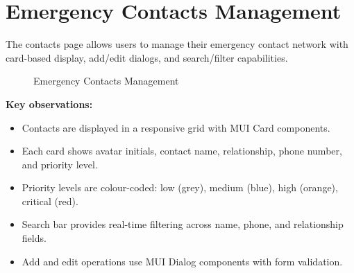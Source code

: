 \section{Emergency Contacts Management}

The contacts page allows users to manage their emergency contact network with card-based display, add/edit dialogs, and search/filter capabilities.

\begin{figure}[H]
  \centering
  \begin{minipage}{0.45\textwidth}
    \centering
  \end{minipage}
  \hfill
  \begin{minipage}{0.45\textwidth}
    \centering
  \end{minipage}
  \caption{Emergency Contacts Management}
  \label{fig:screenshot-contacts}
\end{figure}

\textbf{Key observations:}
\begin{itemize}
  \item Contacts are displayed in a responsive grid with MUI Card components.
  \item Each card shows avatar initials, contact name, relationship, phone number, and priority level.
  \item Priority levels are colour-coded: low (grey), medium (blue), high (orange), critical (red).
  \item Search bar provides real-time filtering across name, phone, and relationship fields.
  \item Add and edit operations use MUI Dialog components with form validation.
\end{itemize}

